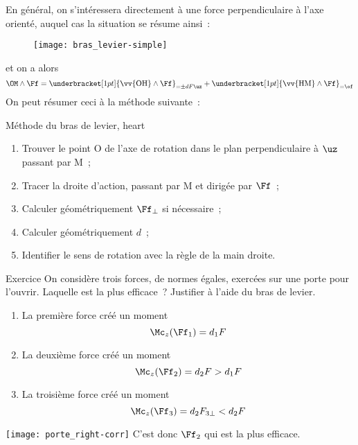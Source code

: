 \documentclass[../main/main.tex]{subfiles}
\begin{document}
En général, on s'intéressera directement à une force perpendiculaire à l'axe
orienté, auquel cas la situation se résume ainsi~:
\begin{figure}[H]
    \centering
    \texttt{[image: bras\_levier-simple]}
\end{figure}
et on a alors
\[
    \OM\wedge\Ff =
        \underbracket[1pt]{\vv{\rm OH}\wedge\Ff}_{=\pm dF\uz} +
        \underbracket[1pt]{\vv{\rm HM}\wedge\Ff}_{=\of}
\]
On peut résumer ceci à la méthode suivante~:

\begin{tror}{Méthode du bras de levier, heart}
    \begin{enumerate}
        \item Trouver le point O de l'axe de rotation dans le plan
            perpendiculaire à $\uz$ passant par M~;
        \item Tracer la droite d'action, passant par M et dirigée par $\Ff$~;
        \item Calculer géométriquement $\Ff_\perp$ si nécessaire~;
        \item Calculer géométriquement $d$~;
        \item Identifier le sens de rotation avec la règle de la main droite.
    \end{enumerate}
\end{tror}

\begin{rexemside}{Exercice}
    On considère trois forces, de normes égales, exercées sur une porte pour
    l'ouvrir. Laquelle est la plus efficace~? Justifier à l'aide du bras de
    levier.
    \smallbreak
    \smallbreak
    \begin{enumerate}
        \item La première force créé un moment
            \[\Mc_z(\Ff_1) = d_1F\]
        \item La deuxième force créé un moment
            \[\Mc_z(\Ff_2) = d_2F > d_1F\]
        \item La troisième force créé un moment
            \[\Mc_z(\Ff_3) = d_2F_{3\perp} < d_2F\]
    \end{enumerate}
    \tcblower
    \begin{center}
        \texttt{[image: porte\_right-corr]}
        C'est donc $\Ff_2$ qui est la plus efficace.
    \end{center}
\end{rexemside}
\end{document}
